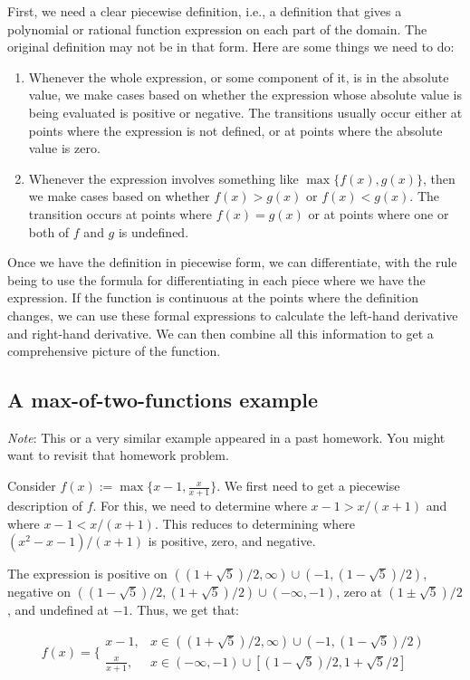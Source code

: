 \documentclass[10pt]{amsart}
\begin{document}
First, we need a clear piecewise definition, i.e., a definition that
gives a polynomial or rational function expression on each part of the
domain. The original definition may not be in that form. Here are some
things we need to do:

\begin{enumerate}
\item Whenever the whole expression, or some component of it, is in
  the absolute value, we make cases based on whether the expression
  whose absolute value is being evaluated is positive or negative. The
  transitions usually occur either at points where the expression is
  not defined, or at points where the absolute value is zero.
\item Whenever the expression involves something like $\max \{ f(x),
  g(x) \}$, then we make cases based on whether $f(x) > g(x)$ or $f(x)
  < g(x)$. The transition occurs at points where $f(x) = g(x)$ or at
  points where one or both of $f$ and $g$ is undefined.
\end{enumerate}

Once we have the definition in piecewise form, we can differentiate,
with the rule being to use the formula for differentiating in each
piece where we have the expression. If the function is continuous at
the points where the definition changes, we can use these formal
expressions to calculate the left-hand derivative and right-hand
derivative. We can then combine all this information to get a
comprehensive picture of the function.

\subsection{A max-of-two-functions example}

{\em Note}: This or a very similar example appeared in a past
homework. You might want to revisit that homework problem.

Consider $f(x) := \max \{ x - 1, \frac{x}{x + 1}
\}$. We first need to get a piecewise description of $f$. For this, we
need to determine where $x - 1 > x/(x+1)$ and where $x - 1 <
x/(x+1)$. This reduces to determining where $(x^2 - x - 1)/(x + 1)$ is
positive, zero, and negative.

The expression is positive on $((1 + \sqrt{5})/2,\infty) \cup (-1,(1 -
\sqrt{5})/2)$, negative on $((1 - \sqrt{5})/2,(1 + \sqrt{5})/2) \cup
(-\infty,-1)$, zero at $(1 \pm \sqrt{5})/2$, and undefined at
$-1$. Thus, we get that:

$$f(x) = \lbrace \begin{array}{rl} x - 1, & x \in ((1 + \sqrt{5})/2,\infty) \cup (-1,(1 - \sqrt{5})/2)\\\frac{x}{x+1}, & x \in (-\infty,-1) \cup [(1 - \sqrt{5})/2,1 + \sqrt{5}/2]\end{array}$$
\end{document}
